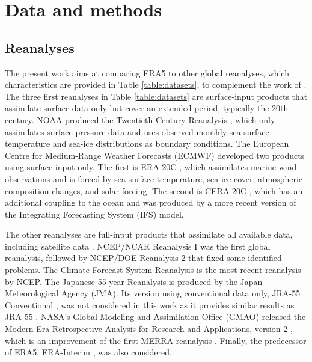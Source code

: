 \documentclass[alpha-refs]{wiley-article}
\begin{document}
\section{Data and methods}
\label{sec:data_methods}

\subsection{Reanalyses}
\label{sec:reanalyses}

The present work aims at comparing ERA5 \citep{Hersbach2019} to other global reanalyses, which characteristics are provided in Table \ref{table:datasets}, to complement the work of \citet{Horton2018b}. The three first reanalyses in Table \ref{table:datasets} are surface-input \citep{Fujiwara2017} products that assimilate surface data only but cover an extended period, typically the 20th century. NOAA produced the Twentieth Century Reanalysis \citep[version 2c, 20CR-2c --][]{Compo2011}, which only assimilates surface pressure data and uses observed monthly sea-surface temperature and sea-ice distributions as boundary conditions. The European Centre for Medium-Range Weather Forecasts (ECMWF) developed two products using surface-input only. The first is ERA-20C \citep{Poli2016}, which assimilates marine wind observations and is forced by sea surface temperature, sea ice cover, atmospheric composition changes, and solar forcing. The second is CERA-20C \citep{Laloyaux2018a}, which has an additional coupling to the ocean and was produced by a more recent version of the Integrating Forecasting System (IFS) model.

The other reanalyses are full-input products that assimilate all available data, including satellite data \citep{Fujiwara2017}. NCEP/NCAR Reanalysis I \citep[NR-1 --][]{Kalnay1996, Kistler2001} was the first global reanalysis, followed by NCEP/DOE Reanalysis 2 \citep[NR-2 --][]{Kanamitsu2002} that fixed some identified problems. The Climate Forecast System Reanalysis \citep[CFSR --][]{Saha2010a} is the most recent reanalysis by NCEP. The Japanese 55-year Reanalysis \citep[JRA-55 --][]{Kobayashi2015, Harada2016} is produced by the Japan Meteorological Agency (JMA). Its version using conventional data only, JRA-55 Conventional \citep[JRA-55C --][]{Kobayashi2014}, was not considered in this work as it provides similar results as JRA-55 \citep{Horton2018b}. NASA's Global Modeling and Assimilation Office (GMAO) released the Modern-Era Retrospective Analysis for Research and Applications, version 2 \citep[MERRA-2 -- ][]{Gelaro2017}, which is an improvement of the first MERRA reanalysis \citep{Rienecker2011}. Finally, the predecessor of ERA5, ERA-Interim \citep[ERA-INT --][]{Dee2011a}, was also considered.
\end{document}
